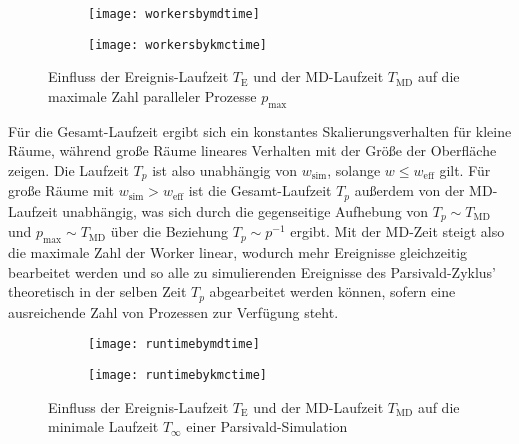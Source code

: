 \begin{figure}[p]

  \captionsetup[subfigure]{singlelinecheck=false}
  \def\subfigwidth{7cm}
  \begin{subfigure}[t]{\subfigwidth}
    \texttt{[image: workersbymdtime]}
  \end{subfigure}
  \hfill
  \begin{subfigure}[t]{\subfigwidth}
    \texttt{[image: workersbykmctime]}
  \end{subfigure}

  \caption{Einfluss der Ereignis-Laufzeit $T_\text{E}$ und der MD-Laufzeit $T_\text{MD}$ auf die maximale Zahl paralleler Prozesse $p_\text{max}$}
  \label{fig:workersbytime}

\end{figure}

Für die Gesamt-Laufzeit ergibt sich ein konstantes Skalierungsverhalten für kleine Räume, während große Räume lineares Verhalten mit der Größe der Oberfläche zeigen.
Die Laufzeit $T_p$ ist also unabhängig von $w_\text{sim}$, solange $w \le w_\text{eff}$ gilt.
Für große Räume mit $w_\text{sim} > w_\text{eff}$ ist die Gesamt-Laufzeit $T_p$ außerdem von der MD-Laufzeit unabhängig, was sich durch die gegenseitige Aufhebung von $T_p \sim T_\text{MD}$ und $p_\text{max} \sim T_\text{MD}$ über die Beziehung $T_p \sim p^{-1}$ ergibt.
Mit der MD-Zeit steigt also die maximale Zahl der Worker linear, wodurch mehr Ereignisse gleichzeitig bearbeitet werden und so alle zu simulierenden Ereignisse des Parsivald-Zyklus' theoretisch in der selben Zeit $T_p$ abgearbeitet werden können, sofern eine ausreichende Zahl von Prozessen zur Verfügung steht.

\begin{figure}[p]

  \captionsetup[subfigure]{singlelinecheck=false}
  \def\subfigwidth{7cm}
  \begin{subfigure}[t]{\subfigwidth}
    \texttt{[image: runtimebymdtime]}
  \end{subfigure}
  \hfill
  \begin{subfigure}[t]{\subfigwidth}
    \texttt{[image: runtimebykmctime]}
  \end{subfigure}

  \caption{Einfluss der Ereignis-Laufzeit $T_\text{E}$ und der MD-Laufzeit $T_\text{MD}$ auf die minimale Laufzeit $T_\infty$ einer Parsivald-Simulation}
  \label{fig:runtimebytime}

\end{figure}


